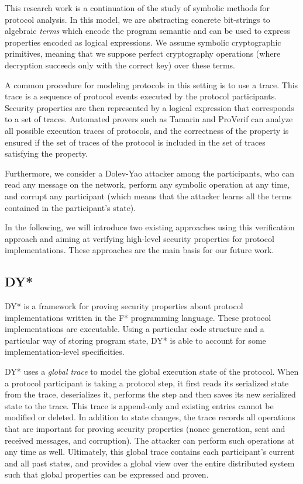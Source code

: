 \documentclass{article}
\begin{document}
This research work is a continuation of the study of symbolic methods for protocol analysis. In this model, we are abstracting concrete bit-strings to algebraic \textit{terms} which encode the program semantic and can be used to express properties encoded as logical expressions.
We assume symbolic cryptographic primitives, meaning that we suppose perfect cryptography operations (where decryption succeeds only with the correct key) over these terms.

A common procedure for modeling protocols in this setting is to use a trace. This trace is a sequence of protocol events executed by the protocol participants. Security properties are then represented by a logical expression that corresponds to a set of traces. Automated provers such as Tamarin and ProVerif can analyze all possible execution traces of protocols, and the correctness of the property is ensured if the set of traces of the protocol is included in the set of traces satisfying the property.

Furthermore, we consider a Dolev-Yao\cite{dolev1983security} attacker among the participants, who can read any message on the network, perform any symbolic operation at any time, and corrupt any participant (which means that the attacker learns all the terms contained in the participant's state).

In the following, we will introduce two existing approaches using this verification approach and aiming at verifying high-level security properties for protocol implementations. These approaches are the main basis for our future work.

\subsection{DY*}

DY*\cite{bhargavan2021text} is a framework for proving security properties about protocol implementations written in the F* programming language. These protocol implementations are executable.
Using a particular code structure and a particular way of storing program state, DY* is able to account for some implementation-level specificities.

DY* uses a \textit{global trace} to model the global execution state of the protocol.
When a protocol participant is taking a protocol step, it first reads its serialized state from the trace, deserializes it, performs the step and then saves its new serialized state to the trace. This trace is append-only and existing entries cannot be modified or deleted. In addition to state changes, the trace records all operations that are important for proving security properties (nonce generation, sent and received messages, and corruption). The attacker can perform such operations at any time as well.
Ultimately, this global trace contains each participant's current and all past states, and provides a global view over the entire distributed system such that global properties can be expressed and proven.
\end{document}
